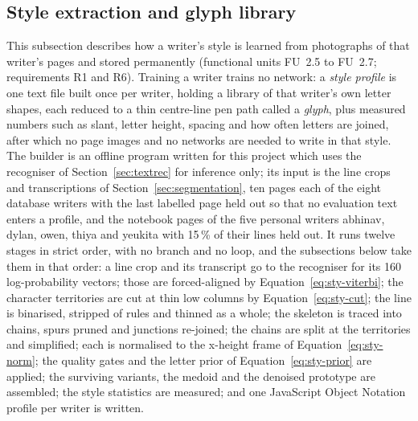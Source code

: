 
\subsection{Style extraction and glyph library}
\label{sec:styleprofile}

This subsection describes how a writer's style is learned from photographs of that writer's pages and stored permanently (functional units FU~2.5 to FU~2.7; requirements R1 and R6).
Training a writer trains no network: a \emph{style profile} is one text file built once per writer, holding a library of that writer's own letter shapes, each reduced to a thin centre-line pen path called a \emph{glyph}, plus measured numbers such as slant, letter height, spacing and how often letters are joined, after which no page images and no networks are needed to write in that style.
The builder is an offline program written for this project which uses the recogniser of Section~\ref{sec:textrec} for inference only; its input is the line crops and transcriptions of Section~\ref{sec:segmentation}, ten pages each of the eight database writers with the last labelled page held out so that no evaluation text enters a profile, and the notebook pages of the five personal writers abhinav, dylan, owen, thiya and yeukita with 15\,\% of their lines held out.
It runs twelve stages in strict order, with no branch and no loop, and the subsections below take them in that order: a line crop and its transcript go to the recogniser for its 160 log-probability vectors; those are forced-aligned by Equation~\ref{eq:sty-viterbi}; the character territories are cut at thin low columns by Equation~\ref{eq:sty-cut}; the line is binarised, stripped of rules and thinned as a whole; the skeleton is traced into chains, spurs pruned and junctions re-joined; the chains are split at the territories and simplified; each is normalised to the x-height frame of Equation~\ref{eq:sty-norm}; the quality gates and the letter prior of Equation~\ref{eq:sty-prior} are applied; the surviving variants, the medoid and the denoised prototype are assembled; the style statistics are measured; and one JavaScript Object Notation profile per writer is written.

